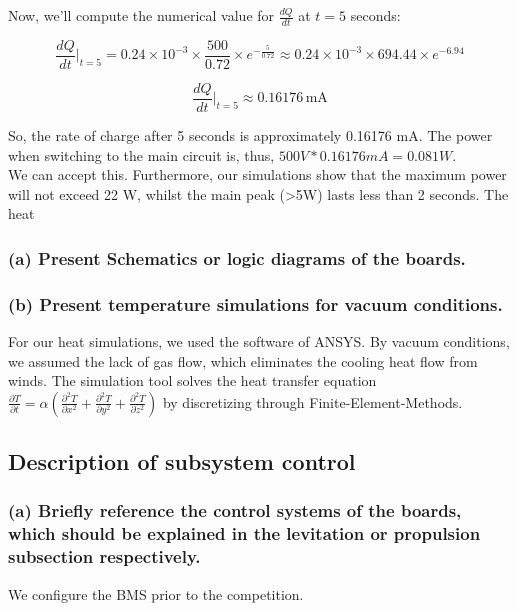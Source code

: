 Now, we'll compute the numerical value for \( \frac{dQ}{dt} \) at \( t = 5 \) seconds:

\[ \frac{dQ}{dt} \Bigg|_{t=5} = 0.24 \times 10^{-3} \times \frac{500}{0.72} \times e^{-\frac{5}{0.72}} \approx 0.24 \times 10^{-3} \times 694.44 \times e^{-6.94} \]

\[ \frac{dQ}{dt} \Bigg|_{t=5} \approx 0.16176 \, \text{mA} \]

So, the rate of charge after 5 seconds is approximately 0.16176 mA.
The power when switching to the main circuit is, thus, \(500V * 0.16176mA = 0.081 W\). \\
We can accept this. Furthermore, our simulations show that the maximum power will not exceed 22 W, whilst the main peak (>5W) lasts 
less than 2 seconds. The heat 

\subsubsection{(a) Present Schematics or logic diagrams of the boards.}
\subsubsection{(b) Present temperature simulations for vacuum conditions.}
For our heat simulations, we used the software of ANSYS. By vacuum conditions, we assumed the
lack of gas flow, which eliminates the cooling heat flow from winds. The simulation tool solves
the heat transfer equation \( \frac{\partial T}{\partial t} = \alpha \left( \frac{\partial^2 T}{\partial x^2} + \frac{\partial^2 T}{\partial y^2} + \frac{\partial^2 T}{\partial z^2} \right) \)
by discretizing through Finite-Element-Methods.

\subsection{Description of subsystem control}
\subsubsection{(a) Briefly reference the control systems of the boards, which should be explained in the levitation or propulsion subsection respectively.}
We configure the BMS prior to the competition. \\
